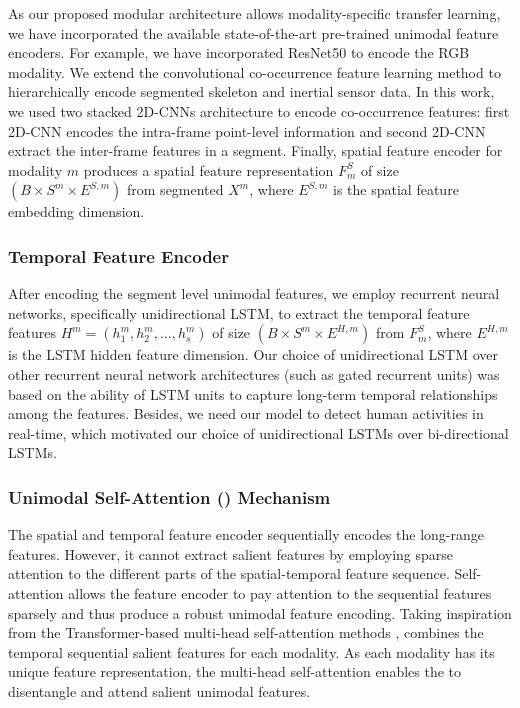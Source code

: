 \documentclass[runningheads]{llncs}
\begin{document}
As our proposed modular architecture allows modality-specific transfer learning, we have incorporated the available state-of-the-art pre-trained unimodal feature encoders. For example, we have incorporated ResNet50 to encode the RGB modality. We extend the convolutional co-occurrence feature learning method \cite{co_occurrence} to hierarchically encode segmented skeleton and inertial sensor data. In this work, we used two stacked 2D-CNNs architecture to encode co-occurrence features: first 2D-CNN encodes the intra-frame point-level information and second 2D-CNN extract the inter-frame features in a segment. Finally, spatial feature encoder for modality $m$ produces a spatial feature representation $F^{S}_{m}$ of size $(B\times S^m \times E^{S,m})$ from segmented $X^m$, where $E^{S,m}$ is the spatial feature embedding dimension. 

\subsubsection{Temporal Feature Encoder}
After encoding the segment level unimodal features, we employ recurrent neural networks, specifically unidirectional LSTM, to extract the temporal feature features $H^m=(h_1^m,h_2^m,...,h_s^m)$ of size $(B\times S^m \times E^{H,m})$ from $F^{S}_{m}$, where $E^{H,m}$ is the LSTM hidden feature dimension. Our choice of unidirectional LSTM over other recurrent neural network architectures (such as gated recurrent units) was based on the ability of LSTM units to capture long-term temporal relationships among the features. Besides, we need our model to detect human activities in real-time, which motivated our choice of unidirectional LSTMs over bi-directional LSTMs. 





\subsubsection{Unimodal Self-Attention ({\uat }) Mechanism}
\label{sec:msa}
The spatial and temporal feature encoder sequentially encodes the long-range features. However, it cannot extract salient features by employing sparse attention to the different parts of the spatial-temporal feature sequence. Self-attention allows the feature encoder to pay attention to the sequential features sparsely and thus produce a robust unimodal feature encoding. Taking inspiration from the Transformer-based multi-head self-attention methods \cite{transformer}, {\uat } combines the temporal sequential salient features for each modality. As each modality has its unique feature representation, the multi-head self-attention enables the {\uat } to disentangle and attend salient unimodal features. 
\end{document}
